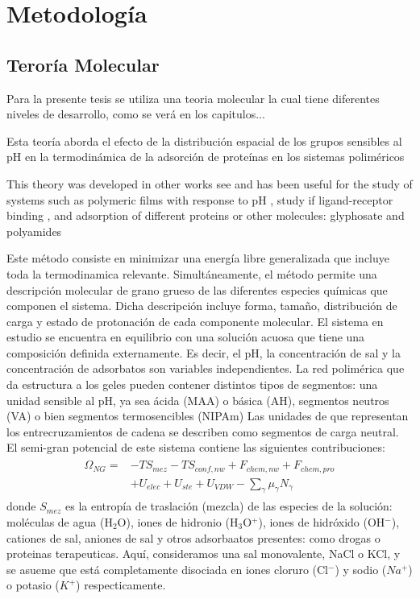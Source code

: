 \chapter{Metodolog\'ia}
\label{Metodologia}


\section{Teror\'ia Molecular}
Para la presente tesis se utiliza una teoria molecular la cual tiene diferentes niveles de desarrollo, como se ver\'a en los capitulos...

Esta teor\'ia aborda el efecto de la distribución espacial de los grupos sensibles al pH en la termodinámica de la adsorción de proteínas en los sistemas poliméricos


This theory was developed in other works see  and has been useful for the study of systems such as polymeric films with response to pH , study if ligand-receptor binding , and adsorption of different proteins  or other molecules: glyphosate and polyamides 



Este método consiste en minimizar una energía libre generalizada que incluye toda la termodinamica relevante.
Simultáneamente, el método permite una descripción molecular de grano grueso de las diferentes especies químicas que componen el sistema.
Dicha descripción incluye forma, tamaño, distribución de carga y estado de protonación de cada componente molecular.
El sistema en estudio se encuentra en  equilibrio con una solución acuosa que tiene una composición  definida externamente.
Es decir, el pH, la concentración de sal y la concentración de adsorbatos son variables independientes.
La red polimérica que da estructura a los geles pueden contener distintos tipos de segmentos: una unidad sensible al pH, ya sea ácida (MAA) o básica (AH), segmentos neutros (VA) o bien segmentos termosencibles (NIPAm)
Las unidades de que representan los entrecruzamientos de cadena se describen como segmentos de carga neutral.
El semi-gran potencial de este sistema contiene las siguientes contribuciones:
\begin{align}
\begin{aligned}
\Omega_{NG}=& -TS_{mez} -TS_{conf,nw} + F_{chem,nw} + F_{chem,pro}\\
& + U_{elec} + U_{ste} + U_{VDW} - {\sum_{\gamma}{\mu_\gamma N_\gamma}}
\end{aligned}
\label{eq:semicano}
\end{align}
\noindent donde $S_{mez}$ es la entropía de traslación (mezcla) de las especies de la solución: moléculas de agua (H$_2$O), iones de hidronio (H$_3$O$^+$), iones de hidróxido (OH$^- $), cationes de sal, aniones de sal y otros adsorbaatos presentes: como drogas o proteinas terapeuticas.
Aquí, consideramos una sal monovalente, NaCl o KCl, y se asueme que está completamente disociada en iones cloruro (Cl$^-$) y sodio ($Na^+$) o potasio ($K^+$) respecticamente. 

